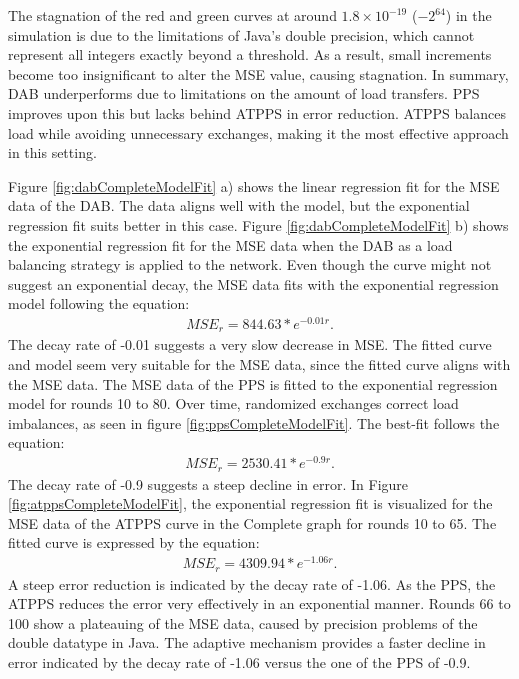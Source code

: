 The stagnation of the red and green curves at around $1.8\times 10^{-19}$ ($-2^{64}$) in the simulation is due to the limitations of Java's double precision, which cannot represent all integers exactly beyond a threshold. As a result, small increments become too insignificant to alter the MSE value, causing stagnation. In summary, DAB underperforms due to limitations on the amount of load transfers. PPS improves upon this but lacks behind ATPPS in error reduction. ATPPS balances load while avoiding unnecessary exchanges, making it the most effective approach in this setting.

Figure \ref{fig:dabCompleteModelFit} a) shows the linear regression fit for the MSE data of the DAB. The data aligns well with the model, but the exponential regression fit suits better in this case. Figure \ref{fig:dabCompleteModelFit} b) shows the exponential regression fit for the MSE data when the DAB as a load balancing strategy is applied to the network. Even though the curve might not suggest an exponential decay, the MSE data fits with the exponential regression model following the equation:
\begin{align}
    MSE_r=844.63*e^{-0.01r}.    
\end{align}
The decay rate of -0.01 suggests a very slow decrease in MSE. The fitted curve and model seem very suitable for the MSE data, since the fitted curve aligns with the MSE data. The MSE data of the PPS is fitted to the exponential regression model for rounds 10 to 80. Over time, randomized exchanges correct load imbalances, as seen in figure \ref{fig:ppsCompleteModelFit}. The best-fit follows the equation:
\begin{align}
    MSE_r=2530.41*e^{-0.9r}.    
\end{align}
The decay rate of -0.9 suggests a steep decline in error. In Figure \ref{fig:atppsCompleteModelFit}, the exponential regression fit is visualized for the MSE data of the ATPPS curve in the Complete graph for rounds 10 to 65. The fitted curve is expressed by the equation:
\begin{align}
    MSE_r=4309.94*e^{-1.06r}.    
\end{align}
A steep error reduction is indicated by the decay rate of -1.06. As the PPS, the ATPPS reduces the error very effectively in an exponential manner. Rounds 66 to 100 show a plateauing of the MSE data, caused by precision problems of the double datatype in Java. The adaptive mechanism provides a faster decline in error indicated by the decay rate of -1.06 versus the one of the PPS of -0.9.

